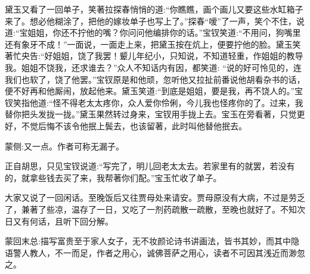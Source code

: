 \begin{parag}
    黛玉又看了一回单子，笑著拉探春悄悄的道:“你瞧瞧，画个画儿又要这些水缸箱子来了。想必他糊涂了，把他的嫁妆单子也写上了。”探春“嗳”了一声，笑个不住，说道:“宝姐姐，你还不拧他的嘴？你问问他编排你的话。”宝钗笑道:“不用问，狗嘴里还有象牙不成！”一面说，一面走上来，把黛玉按在炕上，便要拧他的脸。黛玉笑著忙央告:“好姐姐，饶了我罢！颦儿年纪小，只知说，不知道轻重，作姐姐的教导我。姐姐不饶我，还求谁去？”众人不知话内有因，都笑道: “说的好可怜见的，连我们也软了，饶了他罢。”宝钗原是和他顽，忽听他又拉扯前番说他胡看杂书的话，便不好再和他厮闹，放起他来。黛玉笑道:“到底是姐姐，要是我，再不饶人的。”宝钗笑指他道:“怪不得老太太疼你，众人爱你伶俐，今儿我也怪疼你的了。过来，我替你把头发拢一拢。”黛玉果然转过身来，宝钗用手拢上去。宝玉在旁看著，只觉更好，不觉后悔不该令他抿上鬓去，也该留著，此时叫他替他抿去。\begin{note}蒙侧:又一点。作者可称无漏子。\end{note}正自胡思，只见宝钗说道:“写完了，明儿回老太太去。若家里有的就罢，若没有的，就拿些钱去买了来，我帮著你们配。”宝玉忙收了单子。
\end{parag}


\begin{parag}
    大家又说了一回闲话。至晚饭后又往贾母处来请安。贾母原没有大病，不过是劳乏了，兼著了些凉，温存了一日，又吃了一剂药疏散一疏散，至晚也就好了。不知次日又有何话，且听下回分解。
\end{parag}


\begin{parag}
    \begin{note}蒙回末总:描写富贵至于家人女子，无不妆颜论诗书讲画法，皆书其妙，而其中隐语警人教人，不一而足，作者之用心，诚佛菩萨之用心，读者不可因其浅近而渺忽之。\end{note}
\end{parag}

